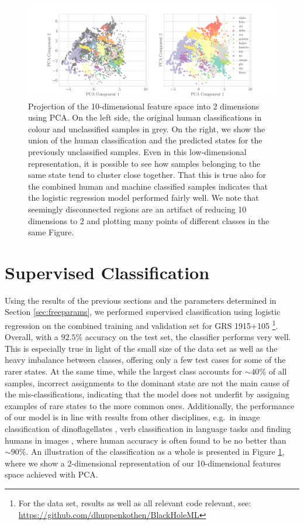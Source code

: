 \documentclass[fleqn,usenatbib]{mnras}
\begin{document}
\begin{figure}
\begin{center}
\includegraphics[width=\textwidth]{grs1915_supervised_pca_comparison.pdf}
\caption{Projection of the 10-dimensional feature space into 2 dimensions using PCA. On the left side, the original human classifications in colour and 
unclassified samples in grey. On the right, we show the union of the human classification and the predicted states for the previously unclassified samples. 
Even in this low-dimensional representation, it is possible to see how samples belonging to the same state tend to cluster close together. That this is true also 
for the combined human and machine classified samples indicates that the logistic regression model performed fairly well. We note that seemingly disconnected 
regions are an artifact of reducing 10 dimensions to 2 and plotting many points of different classes in the same Figure.} 
\label{fig:supervised_pca}
\end{center}
\end{figure}

\section{Supervised Classification}
\label{sec:supervised}

Using the results of the previous sections and the parameters determined in Section \ref{sec:freeparams}, we performed supervised classification using logistic regression on the combined training and validation set for GRS 1915+105 \footnote{For the data set, results as well as all relevant code relevant, see: \url{https://github.com/dhuppenkothen/BlackHoleML}}.
Overall, with a $92.5\%$ accuracy on the test set, the classifier performs very well. This is especially true in light of the small size of the data set as well
as the heavy imbalance between classes, offering only a few test cases for some of the rarer states. At the same time, while the largest class accounts for $\sim 40\%$ of all samples,  incorrect assignments to the dominant state are not the main cause of the mis-classifications, indicating that the model does not underfit by assigning examples of rare states to the more common ones. Additionally, the performance of our model is in line with results from other disciplines, e.g.\ in image classification of dinoflagellates \citep{culverhouse2003}, verb classification in language tasks \citep{merlo2000} and finding humans in images \citep{quinn2010}, where human accuracy is often found to be no better than 
$\sim 90\%$. An illustration of the classification as a whole is presented in Figure \ref{fig:supervised_pca}, 
where we show a 2-dimensional representation of our 10-dimensional features space achieved with PCA. 
\end{document}

